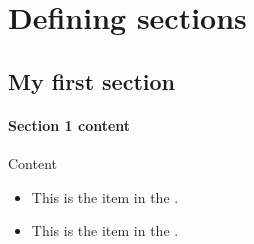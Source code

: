 \setcounter{chapter}{3}
\chapter{Defining sections}

\section{My first section}

\begin{frame}
\frametitle{Section 1 content}
\begin{block}{Content}
\begin{itemize}
\item This is the  item in the .
\item This is the  item in the .
\end{itemize}
\end{block}
\end{frame}


